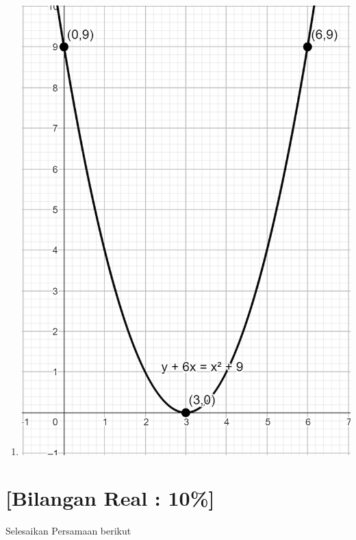 \documentclass[12pt, a4paper]{article}
\begin{document}
\begin{enumerate}
        \item[] \begin{enumerate} \includegraphics[scale=0.3]{1c.png}\end{enumerate}
    \end{enumerate}
    \pagebreak

    \section{[{\bf Bilangan Real} : 10\%] }
    
    Selesaikan Persamaan berikut 
    
\end{document}
